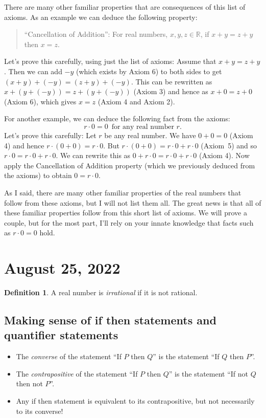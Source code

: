 \documentclass[12pt]{amsart}
\newcommand{\R}{{\mathbb{R}}}
\numberwithin{equation}{section}
\theoremstyle{plain} %
\newcommand{\Aug}[1]{\section{August #1, 2022}}
\theoremstyle{definition}
\newtheorem{defn}[equation]{Definition}
\theoremstyle{remark}
\begin{document}
There are many other familiar properties that are consequences of this list of axioms. As an example we can deduce the following property:
\begin{quote}
  ``Cancellation of Addition'': For real numbers, $x,y,z\in \R$,  if $x + y = z + y$ then $x = z$.
\end{quote}
Let's prove this carefully, using just the list of axioms: Assume that $x + y = z + y$. Then we can add $-y$ (which exists by Axiom 6) to both sides to get
$(x + y) + (-y) = (z + y) + (-y)$. This can be rewritten as $x + (y + (-y)) = z + (y + (-y))$ (Axiom 3) and hence as $x + 0 = z + 0$ (Axiom 6), which gives $x = z$ (Axiom 4 and Axiom 2).



For another example, we can deduce the following fact from the axioms:
$$
r \cdot 0 = 0 \, \text{ for any real number $r$}.
$$
Let's prove this carefully: Let $r$ be any real number. We have $0 +  0 = 0$ (Axiom 4) and hence $r \cdot (0 + 0) = r \cdot 0$. But
$r \cdot (0 + 0) = r \cdot 0 + r \cdot 0$ (Axiom~5) and so $r \cdot 0 = r \cdot 0 + r \cdot 0$. We can rewrite this as
$0 + r \cdot 0 = r \cdot 0 + r \cdot 0$ (Axiom 4). Now apply the Cancellation of Addition property (which we previously deduced from the axioms) to obtain
$0 = r \cdot 0$.

As I said, there are many other familiar properties of the real numbers that follow from these axioms, but I will not list them all. The great news is that all of these familiar properties follow from this short list of axioms. We will prove a couple, but for the most part, I'll rely on your innate knowledge that
facts such as $r \cdot 0 = 0$ hold. 







\Aug{25}

\begin{defn} A real number is \emph{irrational} if it is not rational.
\end{defn}

	
	

\subsection*{Making sense of if then statements and quantifier statements}

\begin{itemize}
\item The \emph{converse} of the statement  ``If $P$ then $Q$'' is the statement  ``If $Q$ then $P$''.
\item The \emph{contrapositive} of the statement  ``If $P$ then $Q$'' is the statement  ``If not $Q$ then not $P$''.
\item Any if then statement is equivalent to its contrapositive, but not necessarily to its converse!
\end{itemize}
\end{document}
